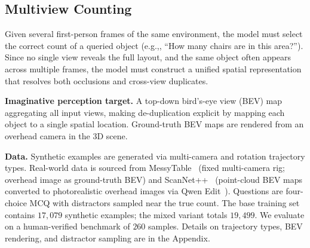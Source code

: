 \documentclass{llmxive}
\providecommand{\eg}{e.g.,\xspace}
\begin{document}
\subsection{Multiview Counting}
\label{sec:multiview_counting}


Given several first-person frames of the same environment, the model must select the correct count of a queried object (\eg, ``How many chairs are in this area?''). Since no single view reveals the full layout, and the same object often appears across multiple frames, the model must construct a unified spatial representation that resolves both occlusions and cross-view duplicates.

\noindent\textbf{Imaginative perception target.} A top-down bird's-eye view (BEV) map aggregating all input views, making de-duplication explicit by mapping each object to a single spatial location. Ground-truth BEV maps are rendered from an overhead camera in the 3D scene.

\noindent\textbf{Data.}
Synthetic examples are generated via multi-camera and rotation trajectory types.
Real-world data is sourced from MessyTable~\cite{cai2020messytable} (fixed multi-camera rig; overhead image as ground-truth BEV) and ScanNet++~\cite{yeshwanth2023scannet++} (point-cloud BEV maps converted to photorealistic overhead images via Qwen Edit~\cite{wu2025qwenimagetechnicalreport}).
Questions are four-choice MCQ with distractors sampled near the true count.
The base training set contains $17{,}079$ synthetic examples; the mixed variant totals $19{,}499$.
We evaluate on a human-verified benchmark of $260$ samples.
Details on trajectory types, BEV rendering, and distractor sampling are in the Appendix.

%
\end{document}
